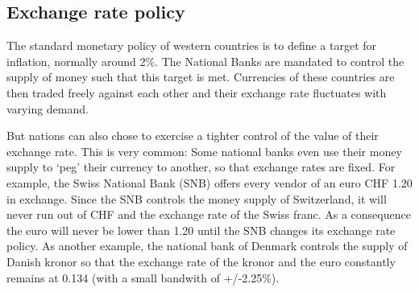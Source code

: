 

\subsection{Exchange rate policy}


The standard monetary policy of western countries is to define a target for inflation, normally around 2\%. The National Banks are mandated to control the supply of money such that this target is met. Currencies of these countries are then traded freely against each other and their exchange rate fluctuates with varying demand. 

But nations can also chose to exercise a tighter control of the value of their 
exchange rate. 
This is very common: Some national banks even use their money 
supply to `peg' their currency to another, so that exchange rates are 
fixed.  For example, the Swiss National Bank (SNB) offers every vendor 
of an euro CHF 1.20 in exchange.  Since the SNB controls the money 
supply of Switzerland, it will never run out of CHF and the exchange 
rate of the Swiss franc. As a consequence the euro will never be lower 
than 1.20 until the SNB changes its exchange rate policy.  As another 
example, the national bank of Denmark controls the supply of Danish 
kronor so that the exchange rate of the kronor and the euro constantly 
remains at 0.134 (with a small bandwith of +/-2.25\%).

